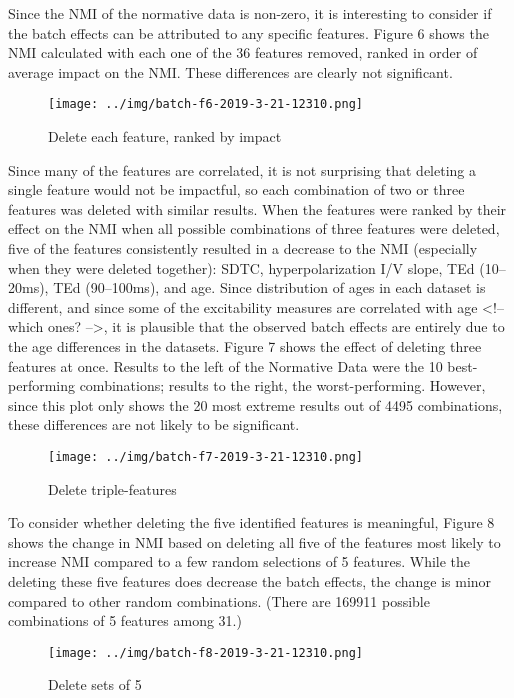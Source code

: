 \documentclass[12pt]{article}
\begin{document}
Since the NMI of the normative data is non-zero, it is interesting to consider if the batch effects can be attributed to any specific features. Figure 6 shows the NMI calculated with each one of the 36 features removed, ranked in order of average impact on the NMI. These differences are clearly not significant.

\begin{figure*}
  \centering
       \texttt{[image: ../img/batch-f6-2019-3-21-12310.png]}
  \caption{Delete each feature, ranked by impact}
  \label{fig:MI}
\end{figure*}

Since many of the features are correlated, it is not surprising that deleting a single feature would not be impactful, so each combination of two or three features was deleted with similar results. When the features were ranked by their effect on the NMI when all possible combinations of three features were deleted, five of the features consistently resulted in a decrease to the NMI (especially when they were deleted together): SDTC, hyperpolarization I/V slope, TEd (10–20ms), TEd (90–100ms), and age. Since distribution of ages in each dataset is different, and since some of the excitability measures are correlated with age <!-- which ones? -->, it is plausible that the observed batch effects are entirely due to the age differences in the datasets. Figure 7 shows the effect of deleting three features at once. Results to the left of the Normative Data were the 10 best-performing combinations; results to the right, the worst-performing. However, since this plot only shows the 20 most extreme results out of 4495 combinations, these differences are not likely to be significant.

\begin{figure*}
  \centering
       \texttt{[image: ../img/batch-f7-2019-3-21-12310.png]}
  \caption{Delete triple-features}
  \label{fig:MI}
\end{figure*}

To consider whether deleting the five identified features is meaningful, Figure 8 shows the change in NMI based on deleting all five of the features most likely to increase NMI compared to a few random selections of 5 features. While the deleting these five features does decrease the batch effects, the change is minor compared to other random combinations. (There are 169911 possible combinations of 5 features among 31.)

\begin{figure*}
  \centering
       \texttt{[image: ../img/batch-f8-2019-3-21-12310.png]}
  \caption{Delete sets of 5}
  \label{fig:MI}
\end{figure*}
\end{document}
